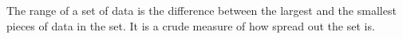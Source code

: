 The range of a set of data is the difference between the largest and the 
smallest pieces of data in the set. It is a crude measure of how spread out
the set is.